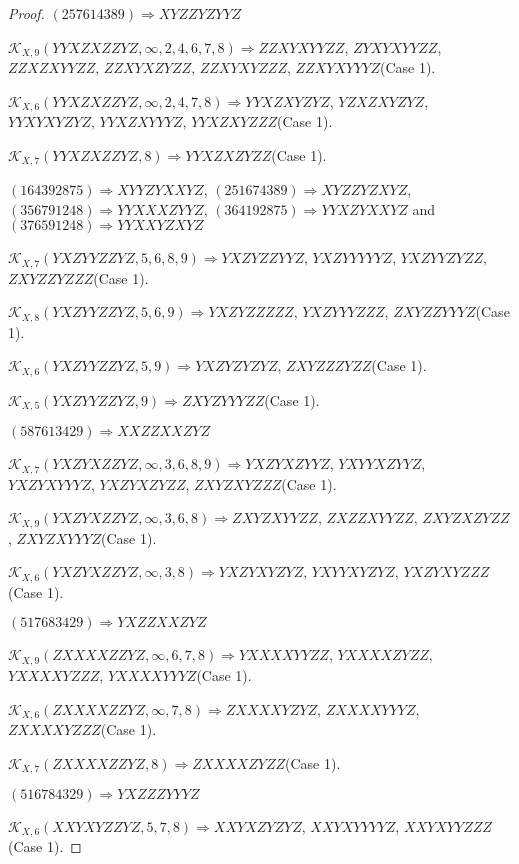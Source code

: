 \documentclass[12pt]{article}
\theoremstyle{plain}
\theoremstyle{definition}
\theoremstyle{remark}
\newcommand{\fancy}[1]{\mathcal{#1}}
\def\K{\fancy{K}}
\begin{document}
\begin{proof}
	$(2 5 7 6 1 4 3 8 9)\Rightarrow XYZZYZYYZ$
	
	
	$\K_{X,9}(YYXZXZZYZ,\infty,2, 4, 6, 7, 8)\Rightarrow $$ZZXYXYYZZ$, $ZYXYXYYZZ$, $ZZXZXYYZZ$, $ZZXYXZYZZ$, $ZZXYXYZZZ$, $ZZXYXYYYZ$(Case 1).
	
	$\K_{X,6}(YYXZXZZYZ,\infty,2, 4, 7, 8)\Rightarrow $$YYXZXYZYZ$, $YZXZXYZYZ$, $YYXYXYZYZ$, $YYXZXYYYZ$, $YYXZXYZZZ$(Case 1).
	
	$\K_{X,7}(YYXZXZZYZ,8)\Rightarrow $$YYXZXZYZZ$(Case 1).
	
	
	
	$(1 6 4 3 9 2 8 7 5)\Rightarrow XYYZYXXYZ$, $(2 5 1 6 7 4 3 8 9)\Rightarrow XYZZYZXYZ$, $(3 5 6 7 9 1 2 4 8)\Rightarrow YYXXXZYYZ$, $(3 6 4 1 9 2 8 7 5)\Rightarrow YYXZYXXYZ$ and $(3 7 6 5 9 1 2 4 8)\Rightarrow YYXXYZXYZ$
	
	
	$\K_{X,7}(YXZYYZZYZ,5, 6, 8, 9)\Rightarrow $$YXZYZZYYZ$, $YXZYYYYYZ$, $YXZYYZYZZ$, $ZXYZZYZZZ$(Case 1).
	
	$\K_{X,8}(YXZYYZZYZ,5, 6, 9)\Rightarrow $$YXZYZZZZZ$, $YXZYYYZZZ$, $ZXYZZYYYZ$(Case 1).
	
	$\K_{X,6}(YXZYYZZYZ,5, 9)\Rightarrow $$YXZYZYZYZ$, $ZXYZZZYZZ$(Case 1).
	
	$\K_{X,5}(YXZYYZZYZ,9)\Rightarrow $$ZXYZYYYZZ$(Case 1).
	
	
	
	$(5 8 7 6 1 3 4 2 9)\Rightarrow XXZZXXZYZ$
	
	
	$\K_{X,7}(YXZYXZZYZ,\infty,3, 6, 8, 9)\Rightarrow $$YXZYXZYYZ$, $YXYYXZYYZ$, $YXZYXYYYZ$, $YXZYXZYZZ$, $ZXYZXYZZZ$(Case 1).
	
	$\K_{X,9}(YXZYXZZYZ,\infty,3, 6, 8)\Rightarrow $$ZXYZXYYZZ$, $ZXZZXYYZZ$, $ZXYZXZYZZ$, $ZXYZXYYYZ$(Case 1).
	
	$\K_{X,6}(YXZYXZZYZ,\infty,3, 8)\Rightarrow $$YXZYXYZYZ$, $YXYYXYZYZ$, $YXZYXYZZZ$(Case 1).
	
	
	
	$(5 1 7 6 8 3 4 2 9)\Rightarrow YXZZXXZYZ$
	
	
	$\K_{X,9}(ZXXXXZZYZ,\infty,6, 7, 8)\Rightarrow $$YXXXXYYZZ$, $YXXXXZYZZ$, $YXXXXYZZZ$, $YXXXXYYYZ$(Case 1).
	
	$\K_{X,6}(ZXXXXZZYZ,\infty,7, 8)\Rightarrow $$ZXXXXYZYZ$, $ZXXXXYYYZ$, $ZXXXXYZZZ$(Case 1).
	
	$\K_{X,7}(ZXXXXZZYZ,8)\Rightarrow $$ZXXXXZYZZ$(Case 1).
	
	
	
	$(5 1 6 7 8 4 3 2 9)\Rightarrow YXZZZYYYZ$
	
	
	$\K_{X,6}(XXYXYZZYZ,5, 7, 8)\Rightarrow $$XXYXZYZYZ$, $XXYXYYYYZ$, $XXYXYYZZZ$(Case 1).
	

\end{proof}
\end{document}
